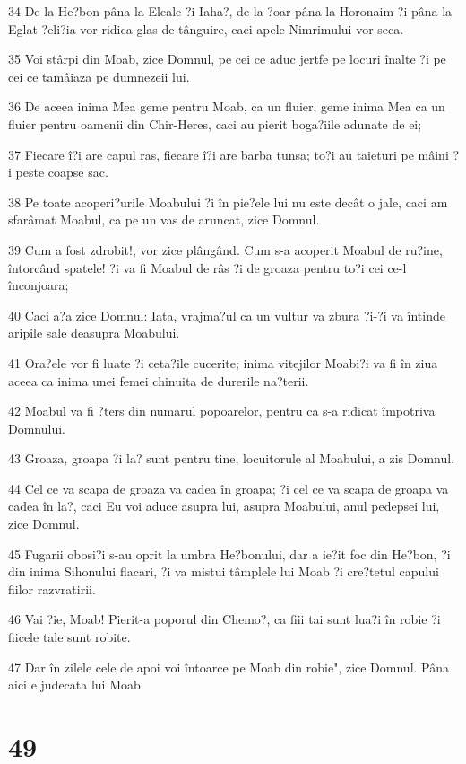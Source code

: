 \par 34 De la He?bon pâna la Eleale ?i Iaha?, de la ?oar pâna la Horonaim ?i pâna la Eglat-?eli?ia vor ridica glas de tânguire, caci apele Nimrimului vor seca.
\par 35 Voi stârpi din Moab, zice Domnul, pe cei ce aduc jertfe pe locuri înalte ?i pe cei ce tamâiaza pe dumnezeii lui.
\par 36 De aceea inima Mea geme pentru Moab, ca un fluier; geme inima Mea ca un fluier pentru oamenii din Chir-Heres, caci au pierit boga?iile adunate de ei;
\par 37 Fiecare î?i are capul ras, fiecare î?i are barba tunsa; to?i au taieturi pe mâini ?i peste coapse sac.
\par 38 Pe toate acoperi?urile Moabului ?i în pie?ele lui nu este decât o jale, caci am sfarâmat Moabul, ca pe un vas de aruncat, zice Domnul.
\par 39 Cum a fost zdrobit!, vor zice plângând. Cum s-a acoperit Moabul de ru?ine, întorcând spatele! ?i va fi Moabul de râs ?i de groaza pentru to?i cei ce-l înconjoara;
\par 40 Caci a?a zice Domnul: Iata, vrajma?ul ca un vultur va zbura ?i-?i va întinde aripile sale deasupra Moabului.
\par 41 Ora?ele vor fi luate ?i ceta?ile cucerite; inima vitejilor Moabi?i va fi în ziua aceea ca inima unei femei chinuita de durerile na?terii.
\par 42 Moabul va fi ?ters din numarul popoarelor, pentru ca s-a ridicat împotriva Domnului.
\par 43 Groaza, groapa ?i la? sunt pentru tine, locuitorule al Moabului, a zis Domnul.
\par 44 Cel ce va scapa de groaza va cadea în groapa; ?i cel ce va scapa de groapa va cadea în la?, caci Eu voi aduce asupra lui, asupra Moabului, anul pedepsei lui, zice Domnul.
\par 45 Fugarii obosi?i s-au oprit la umbra He?bonului, dar a ie?it foc din He?bon, ?i din inima Sihonului flacari, ?i va mistui tâmplele lui Moab ?i cre?tetul capului fiilor razvratirii.
\par 46 Vai ?ie, Moab! Pierit-a poporul din Chemo?, ca fiii tai sunt lua?i în robie ?i fiicele tale sunt robite.
\par 47 Dar în zilele cele de apoi voi întoarce pe Moab din robie", zice Domnul. Pâna aici e judecata lui Moab.

\chapter{49}

